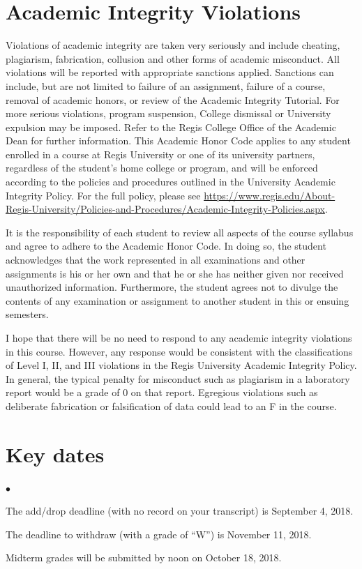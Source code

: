 \documentclass[11pt]{article}
\newcommand{\squishlist}{
   \begin{list}{$\bullet$}
    { \setlength{\itemsep}{0pt}      \setlength{\parsep}{3pt}
      \setlength{\topsep}{3pt}       \setlength{\partopsep}{0pt}
      \setlength{\leftmargin}{1.5em} \setlength{\labelwidth}{1em}
      \setlength{\labelsep}{0.5em} } }
\newcommand{\squishend}{
    \end{list}  }
\begin{document}
\section{Academic Integrity Violations}

Violations of academic integrity are taken very seriously and include cheating, plagiarism, fabrication, collusion and other forms of academic misconduct.  All violations will be reported with appropriate sanctions applied.  Sanctions can include, but are not limited to failure of an assignment, failure of a course, removal of academic honors, or review of the Academic Integrity Tutorial.  For more serious violations, program suspension, College dismissal or University expulsion may be imposed.  Refer to the Regis College Office of the Academic Dean for further information.  This Academic Honor Code applies to any student enrolled in a course at Regis University or one of its university partners, regardless of the student's home college or program, and will be enforced according to the policies and procedures outlined in the University Academic Integrity Policy.  For the full policy, please see \url{https://www.regis.edu/About-Regis-University/Policies-and-Procedures/Academic-Integrity-Policies.aspx}.

It is the responsibility of each student to review all aspects of the course syllabus and agree to adhere to the Academic Honor Code.  In doing so, the student acknowledges that the work represented in all examinations and other assignments is his or her own and that he or she has neither given nor received unauthorized information.  Furthermore, the student agrees not to divulge the contents of any examination or assignment to another student in this or ensuing semesters.  


I hope that there will be no need to respond to any academic integrity
violations in this course.  However, any response would be consistent with the
classifications of Level I, II, and III violations in the Regis University
Academic Integrity Policy.  In general, the typical penalty for misconduct
such as plagiarism in a laboratory report would be a grade of 0 on that report.
Egregious violations such as deliberate fabrication or falsification of data 
could lead to an F in the course.

\section{Key dates}
\squishlist
\item The add/drop deadline (with no record on your transcript) is September 4, 2018.
\item The deadline to withdraw (with a grade of ``W'') is November 11, 2018.  
\item Midterm grades will be submitted by noon on October 18, 2018.
\squishend
\end{document}
